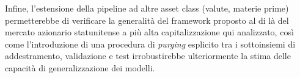 Infine, l'estensione della pipeline ad altre asset class (valute, materie prime) permetterebbe di verificare la generalità del framework proposto al di là del mercato azionario statunitense a più alta capitalizzazione qui analizzato, così come l'introduzione di una procedura di \emph{purging} esplicito tra i sottoinsiemi di addestramento, validazione e test irrobustirebbe ulteriormente la stima delle capacità di generalizzazione dei modelli.
